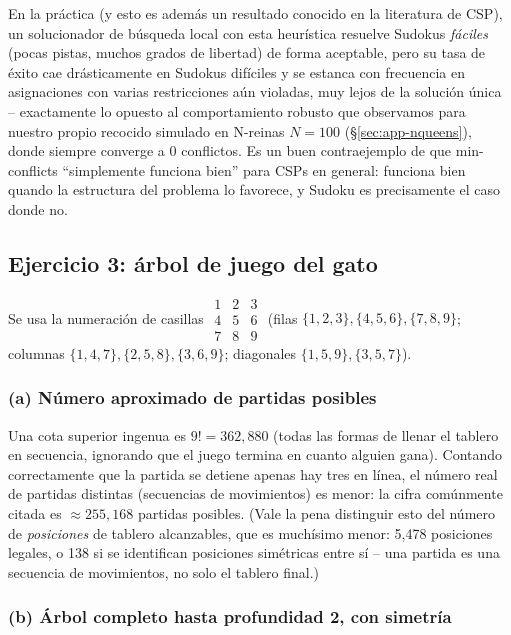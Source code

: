 \documentclass[11pt,onecolumn,letterpaper]{article}
\begin{document}
En la pr\'actica (y esto es adem\'as un resultado conocido en la literatura de CSP), un
solucionador de b\'usqueda local con esta heur\'istica resuelve Sudokus \emph{f\'aciles}
(pocas pistas, muchos grados de libertad) de forma aceptable, pero su tasa de \'exito cae
dr\'asticamente en Sudokus dif\'iciles y se estanca con frecuencia en asignaciones con
varias restricciones a\'un violadas, muy lejos de la soluci\'on \'unica -- exactamente lo
opuesto al comportamiento robusto que observamos para nuestro propio recocido simulado en
N-reinas $N=100$ (\S\ref{sec:app-nqueens}), donde siempre converge a 0 conflictos. Es un
buen contraejemplo de que min-conflicts ``simplemente funciona bien'' para CSPs en
general: funciona bien quando la estructura del problema lo favorece, y Sudoku es
precisamente el caso donde no.

\subsection{Ejercicio 3: \'arbol de juego del gato}
\label{sec:ex3}

Se usa la numeraci\'on de casillas
$\begin{smallmatrix}1&2&3\\4&5&6\\7&8&9\end{smallmatrix}$
(filas $\{1,2,3\},\{4,5,6\},\{7,8,9\}$; columnas $\{1,4,7\},\{2,5,8\},\{3,6,9\}$;
diagonales $\{1,5,9\},\{3,5,7\}$).

\subsubsection*{(a) N\'umero aproximado de partidas posibles}

Una cota superior ingenua es $9!=362{,}880$ (todas las formas de llenar el tablero en
secuencia, ignorando que el juego termina en cuanto alguien gana). Contando correctamente
que la partida se detiene apenas hay tres en l\'inea, el n\'umero real de partidas
distintas (secuencias de movimientos) es menor: la cifra com\'unmente citada es
\textbf{$\approx 255{,}168$} partidas posibles. (Vale la pena distinguir esto del n\'umero
de \emph{posiciones} de tablero alcanzables, que es much\'isimo menor: 5{,}478 posiciones
legales, o 138 si se identifican posiciones sim\'etricas entre s\'i -- una partida es una
secuencia de movimientos, no solo el tablero final.)

\subsubsection*{(b) \'Arbol completo hasta profundidad 2, con simetr\'ia}
\end{document}
